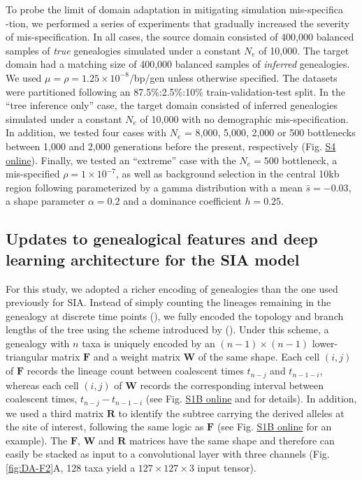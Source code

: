 To probe the limit of domain adaptation in mitigating simulation mis-specifica\\-tion, we performed a series of experiments that gradually increased the severity of mis-specification. In all cases, the source domain consisted of 400,000 balanced samples of \textit{true} genealogies simulated under a constant $N_e$ of 10,000. The target domain had a matching size of 400,000 balanced samples of \textit{inferred} genealogies. We used $\mu = \rho = 1.25\times 10^{-8}$/bp/gen unless otherwise specified. The datasets were partitioned following an 87.5\%:2.5\%:10\% train-validation-test split. In the “tree inference only” case, the target domain consisted of inferred genealogies simulated under a constant $N_e$ of 10,000 with no demographic mis-specification. In addition, we tested four cases with $N_e$ = 8,000, 5,000, 2,000 or 500 bottlenecks between 1,000 and 2,000 generations before the present, respectively (Fig. \href{https://journals.plos.org/plosgenetics/article?id=10.1371/journal.pgen.1011032#sec018}{S4 online}). Finally, we tested an “extreme” case with the $N_e = 500$ bottleneck, a mis-specified $\rho = 1\times 10^{-7}$, as well as background selection in the central 10kb region following  parameterized by a gamma distribution with a mean $\bar{s}=-0.03$, a shape parameter $\alpha = 0.2$ and a dominance coefficient $h = 0.25$.

\subsection{Updates to genealogical features and deep learning architecture for the \ac{SIA} model}

For this study, we adopted a richer encoding of genealogies than the one used previously for \ac{SIA}. Instead of simply counting the lineages remaining in the genealogy at discrete time points (\cite{hejase_deep-learning_2022}), we fully encoded the topology and branch lengths of the tree using the scheme introduced by (\cite{kim_distance_2020}). Under this scheme, a genealogy with $n$ taxa is uniquely encoded by an $(n-1) \times (n-1)$ lower-triangular matrix $\mathbf{F}$ and a weight matrix $\mathbf{W}$ of the same shape. Each cell $(i, j)$ of $\mathbf{F}$ records the lineage count between coalescent times $t_{n-j}$ and $t_{n-1-i}$, whereas each cell $(i, j)$ of $\mathbf{W}$ records the corresponding interval between coalescent times, $t_{n-j}-t_{n-1-i}$ (see Fig. \href{https://journals.plos.org/plosgenetics/article?id=10.1371/journal.pgen.1011032#sec018}{S1B online} and \cite{kim_distance_2020} for details). In addition, we used a third matrix $\mathbf{R}$ to identify the subtree carrying the derived alleles at the site of interest, following the same logic as $\mathbf{F}$ (see Fig. \href{https://journals.plos.org/plosgenetics/article?id=10.1371/journal.pgen.1011032#sec018}{S1B online} for an example). The $\mathbf{F}$, $\mathbf{W}$ and $\mathbf{R}$ matrices have the same shape and therefore can easily be stacked as input to a convolutional layer with three channels (Fig. \ref{fig:DA-F2}A, 128 taxa yield a $127 \times 127 \times 3$ input tensor).

